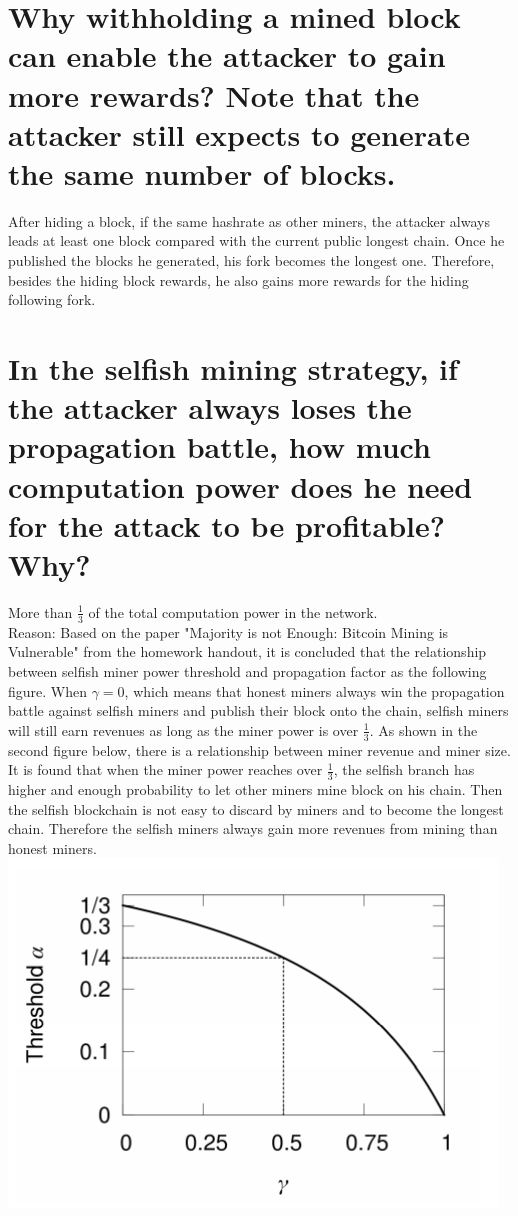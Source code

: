 \documentclass{article}
\begin{document}
\section{Why withholding a mined block can enable the attacker to gain more rewards?
Note that the attacker still expects to generate the same number of blocks.}
After hiding a block, if the same hashrate as other miners, 
the attacker always leads at least one block compared with the current public longest chain.
Once he published the blocks he generated, his fork becomes the longest one. 
Therefore, besides the hiding block rewards, 
he also gains more rewards for the hiding following fork.
\section{In the selfish mining strategy, if the attacker always loses the propagation battle,
how much computation power does he need for the attack to be profitable?
Why?}
More than $\frac{1}{3}$ of the total computation power in the network.\\
Reason: Based on the paper "Majority is not Enough:
Bitcoin Mining is Vulnerable" from the homework handout, 
it is concluded that the relationship 
between selfish miner power threshold and propagation factor
as the following figure.
When $\gamma=0$, which means that honest miners always win the propagation battle
against selfish miners and publish their block onto the chain,
selfish miners will still earn revenues as long as the miner power is over $\frac{1}{3}$.
As shown in the second figure below, 
there is a relationship between miner revenue and miner size.
It is found that when the miner power reaches over $\frac{1}{3}$, 
the selfish branch has higher and enough probability to let other miners mine block
on his chain. Then the selfish blockchain is not easy to discard by miners 
and to become the longest chain.
Therefore the selfish miners always gain more revenues from mining than honest miners.
\\\includegraphics[width=130mm,scale=1]{tr.png}\\
\end{document}
